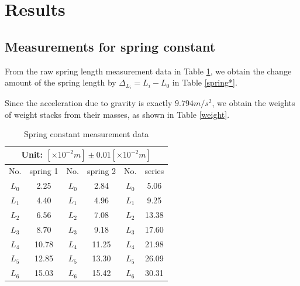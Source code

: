 \section{Results}
\subsection{Measurements for spring constant}
    From the raw spring length measurement data in Table \ref{spring}, we obtain the change amount of the spring length by $\Delta_{L_i}=L_i-L_0$ in Table \ref{spring*}.

    Since the acceleration due to gravity is exactly $9.794m/s^2$, we obtain the weights of weight stacks from their masses, as shown in Table \ref{weight}.\\
    
    \begin{table}[htbp]
        \centering
        \begin{tabular}{|c|c|c|c|c|c|}
            \hline
            \multicolumn{6}{|c|}{Unit: $[\times 10^{-2}m]\pm 0.01[\times 10^{-2}m]$}\\ \hline
            No. & spring 1 & No. & spring 2 & No. & series\\ \hline
            $L_0$ & 2.25 & $L_0$ & 2.84 & $L_0$ & 5.06\\ \hline
            $L_1$ & 4.40 & $L_1$ & 4.96	& $L_1$ & 9.25\\ \hline
            $L_2$ & 6.56 & $L_2$ & 7.08 & $L_2$ & 13.38\\ \hline
            $L_3$ & 8.70 & $L_3$ & 9.18	& $L_3$ & 17.60\\ \hline
            $L_4$ & 10.78 & $L_4$ & 11.25 & $L_4$ & 21.98\\ \hline
            $L_5$ & 12.85 & $L_5$ & 13.30 & $L_5$ & 26.09\\ \hline
            $L_6$ & 15.03 & $L_6$ &	15.42 & $L_6$ &	30.31\\ \hline
        \end{tabular}
        \caption{Spring constant measurement data}\label{spring}
    \end{table}
